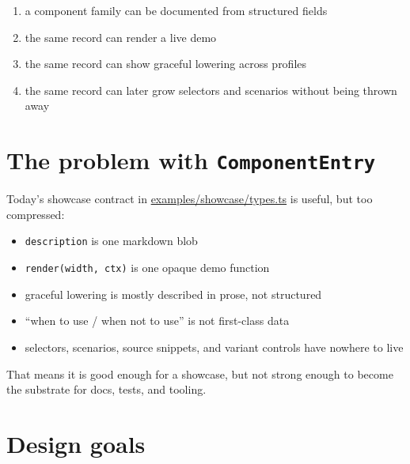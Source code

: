 \begin{enumerate}
\def\labelenumi{\arabic{enumi}.}
\tightlist
\item
  a component family can be documented from structured fields
\item
  the same record can render a live demo
\item
  the same record can show graceful lowering across profiles
\item
  the same record can later grow selectors and scenarios without being thrown away
\end{enumerate}

\section{\texorpdfstring{The problem with \texttt{C\allowbreak{}o\allowbreak{}m\allowbreak{}p\allowbreak{}o\allowbreak{}n\allowbreak{}e\allowbreak{}n\allowbreak{}t\allowbreak{}E\allowbreak{}n\allowbreak{}t\allowbreak{}r\allowbreak{}y}}{The problem with }}\label{record-039-the-problem-with-componententry}

Today's showcase contract in \href{https://github.com/flyingrobots/bijou/blob/cbd70612140e7a450d764b3c7be1c6af878b99bc/examples/showcase/types.ts}{examples/showcase/types.ts} is useful, but too compressed:

\begin{itemize}
\tightlist
\item
  \texttt{d\allowbreak{}e\allowbreak{}s\allowbreak{}c\allowbreak{}r\allowbreak{}i\allowbreak{}p\allowbreak{}t\allowbreak{}i\allowbreak{}o\allowbreak{}n} is one markdown blob
\item
  \texttt{r\allowbreak{}e\allowbreak{}n\allowbreak{}d\allowbreak{}e\allowbreak{}r\allowbreak{}(\allowbreak{}w\allowbreak{}i\allowbreak{}d\allowbreak{}t\allowbreak{}h\allowbreak{},\allowbreak{} \allowbreak{}c\allowbreak{}t\allowbreak{}x\allowbreak{})} is one opaque demo function
\item
  graceful lowering is mostly described in prose, not structured
\item
  ``when to use / when not to use'' is not first-class data
\item
  selectors, scenarios, source snippets, and variant controls have nowhere to live
\end{itemize}

That means it is good enough for a showcase, but not strong enough to become the substrate for docs, tests, and tooling.

\section{Design goals}\label{record-039-design-goals}

